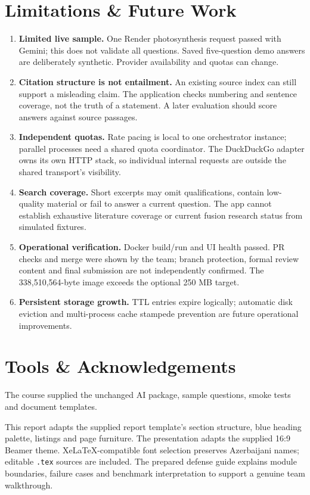 \documentclass[11pt,a4paper]{article}
\begin{document}
\section{Limitations \& Future Work}
\begin{enumerate}[leftmargin=*]
\item \textbf{Limited live sample.} One Render photosynthesis request passed with Gemini; this does not validate all questions. Saved five-question demo answers are deliberately synthetic. Provider availability and quotas can change.
\item \textbf{Citation structure is not entailment.} An existing source index can still support a misleading claim. The application checks numbering and sentence coverage, not the truth of a statement. A later evaluation should score answers against source passages.
\item \textbf{Independent quotas.} Rate pacing is local to one orchestrator instance; parallel processes need a shared quota coordinator. The DuckDuckGo adapter owns its own HTTP stack, so individual internal requests are outside the shared transport's visibility.
\item \textbf{Search coverage.} Short excerpts may omit qualifications, contain low-quality material or fail to answer a current question. The app cannot establish exhaustive literature coverage or current fusion research status from simulated fixtures.
\item \textbf{Operational verification.} Docker build/run and UI health passed. PR checks and merge were shown by the team; branch protection, formal review content and final submission are not independently confirmed. The 338,510,564-byte image exceeds the optional 250 MB target.
\item \textbf{Persistent storage growth.} TTL entries expire logically; automatic disk eviction and multi-process cache stampede prevention are future operational improvements.
\end{enumerate}

\section{Tools \& Acknowledgements}
The course supplied the unchanged AI package, sample questions, smoke tests and document templates.

This report adapts the supplied report template's section structure, blue heading palette, listings and page furniture. The presentation adapts the supplied 16:9 Beamer theme. XeLaTeX-compatible font selection preserves Azerbaijani names; editable \texttt{.tex} sources are included. The prepared defense guide explains module boundaries, failure cases and benchmark interpretation to support a genuine team walkthrough.
\end{document}

